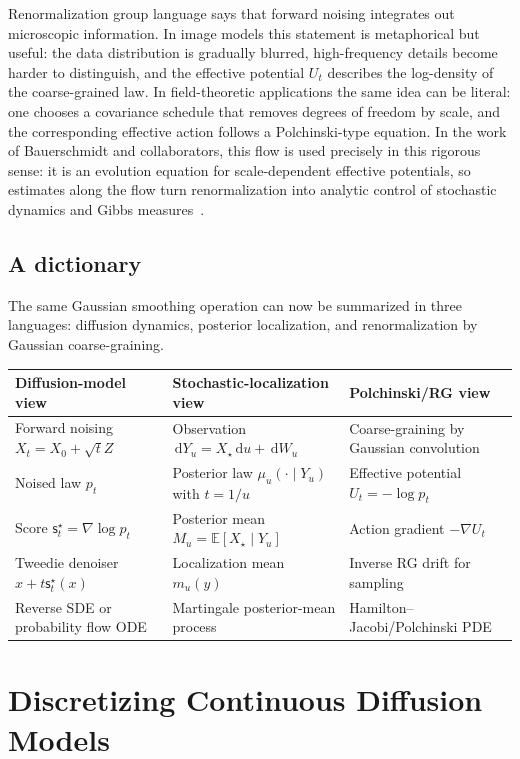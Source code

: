 \documentclass[10pt,a4paper]{amsart}
\numberwithin{equation}{section}
\newcommand{\E}{\mathbb{E}}
\newcommand{\dd}{\,\mathrm{d}}
\newcommand{\sstar}{\mathsf{s}^{\star}}
\begin{document}
Renormalization group language says that forward noising integrates out
microscopic information.  In image models this statement is metaphorical but
useful: the data distribution is gradually blurred, high-frequency details
become harder to distinguish, and the effective potential $U_t$ describes
the log-density of the coarse-grained law.  In field-theoretic applications the
same idea can be literal: one chooses a covariance schedule that removes
degrees of freedom by scale, and the corresponding effective action follows a
Polchinski-type equation.
In the work of Bauerschmidt and collaborators, this flow is used precisely in
this rigorous sense: it is an evolution equation for scale-dependent effective
potentials, so estimates along the flow turn renormalization into analytic
control of stochastic dynamics and Gibbs measures~\cite{bauerschmidt2024polchinski}.


\subsection{A dictionary}

The same Gaussian smoothing operation can now be summarized in three languages:
diffusion dynamics, posterior localization, and renormalization by Gaussian
coarse-graining.
\begin{center}
\small
\begin{tabular}{p{}|p{}|p{}}
Diffusion-model view & Stochastic-localization view & Polchinski/RG view\\
\hline
Forward noising $X_t=X_0+\sqrt{t}Z$ &
Observation $\dd Y_u=X_\star\dd u+\dd W_u$ &
Coarse-graining by Gaussian convolution\\
Noised law $p_t$ &
Posterior law $\mu_u(\cdot\mid Y_u)$ with $t=1/u$ &
Effective potential $U_t=-\log p_t$\\
Score $\sstar_t=\nabla\log p_t$ &
Posterior mean $M_u=\E[X_\star\mid Y_u]$ &
Action gradient $-\nabla U_t$\\
Tweedie denoiser $x+t\sstar_t(x)$ &
Localization mean $m_u(y)$ &
Inverse RG drift for sampling\\
Reverse SDE or probability flow ODE &
Martingale posterior-mean process &
Hamilton--Jacobi/Polchinski PDE\\
\end{tabular}
\end{center}

\section{Discretizing Continuous Diffusion Models}\label{sec:discretizing}
\end{document}
